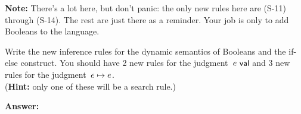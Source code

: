 \documentclass{article}
\begin{document}
\textbf{Note:} There's a lot here, but don't panic:
the only new rules here are (S-11) through (S-14). The rest are just there
as a reminder. Your job is only to add Booleans to the language.

{
  \centering
  \def \MathparLineskip {\lineskip=0.43cm}
}

\begin{task}\label{task:dyn}
  Write the new inference rules for the dynamic semantics of Booleans and the
  if-else construct.
  You should have 2 new rules for the judgment~$e~\mathsf{val}$ and 3 new rules
  for the judgment~$e \mapsto e$.\\
  (\textbf{Hint:} only one of these will be a search rule.)
\end{task}

\textbf{Answer:}

{
    \centering
    \def \MathparLineskip{\lineskip=0.43cm}
}
\end{document}

